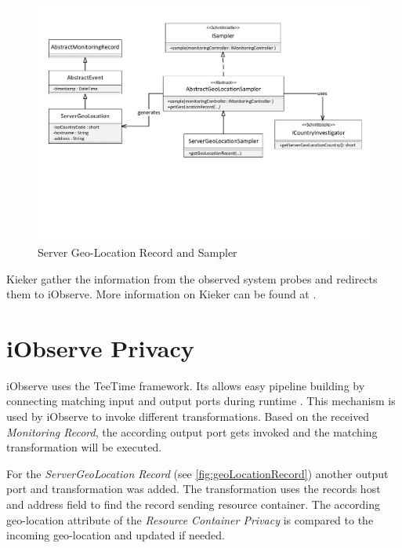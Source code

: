 \begin{figure}[h]
	\centering
	\includegraphics[trim = 10mm 70mm 5mm 5mm, clip, width=1.00\textwidth]{graphs/GeoLocationRecord}
	\caption{Server Geo-Location Record and Sampler}
	\label{fig:geoLocationRecord}
\end{figure}

Kieker gather the information from the observed system probes and redirects them to iObserve. More information on Kieker can be found at \cite{kieker.web}.

\section{iObserve Privacy}
\label{sec:iObserve:privacy}

iObserve uses the TeeTime framework. Its allows easy pipeline building by connecting matching input and output ports during runtime \cite{teetime.16.05.2017}. This mechanism is used by iObserve to invoke different transformations. Based on the received \textit{Monitoring Record}, the according output port gets invoked and the matching transformation will be executed.

For the \textit{ServerGeoLocation Record} (see \autoref{fig:geoLocationRecord}) another output port and transformation was added. The transformation uses the records host and address field to find the record sending resource container. The according geo-location attribute of the \textit{Resource Container Privacy} is compared to the incoming geo-location and updated if needed.

